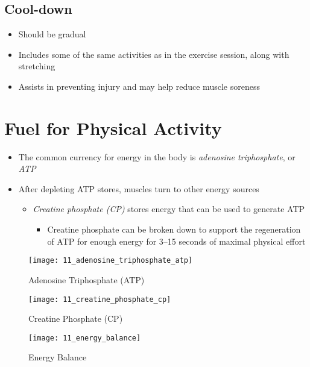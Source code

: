 \documentclass[title={Chapter 11}]{fdsn201notes}
\begin{document}
\subsection{Cool-down}\label{subsec:cool-down}
\begin{itemize}
	\item Should be gradual
	\item Includes some of the same activities as in the exercise session, along with stretching
	\item Assists in preventing injury and may help reduce muscle soreness
\end{itemize}

\section{Fuel for Physical Activity}\label{sec:fuel-for-physical-activity}
\begin{itemize}
	\item The common currency for energy in the body is \emph{adenosine triphosphate}, or \emph{ATP}
	\item After depleting ATP stores, muscles turn to other energy sources
	\begin{itemize}
		\item \emph{Creatine phosphate (CP)} stores energy that can be used to generate ATP
		\begin{itemize}
			\item Creatine phosphate can be broken down to support the regeneration of ATP for enough energy for 3--15 seconds of maximal physical effort
		\end{itemize}
	\end{itemize}
\end{itemize}

\begin{figure}[H]
	\centering
	\texttt{[image: 11\_adenosine\_triphosphate\_atp]}
	\caption{Adenosine Triphosphate (ATP)}
	\label{fig:atp}
\end{figure}

\begin{figure}[H]
	\centering
	\texttt{[image: 11\_creatine\_phosphate\_cp]}
	\caption{Creatine Phosphate (CP)}
	\label{fig:creatine-phosphate}
\end{figure}

\begin{figure}[H]
	\centering
	\texttt{[image: 11\_energy\_balance]}
	\caption{Energy Balance}
	\label{fig:energy-balance}
\end{figure}
\end{document}
